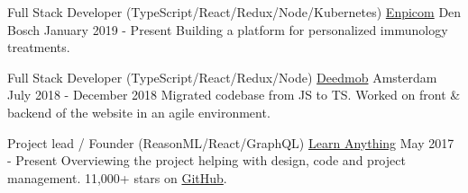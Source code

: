 
\begin{cventries}

  \cventry
    {Full Stack Developer (TypeScript/React/Redux/Node/Kubernetes)} %
    {\href{https://www.enpicom.com}{Enpicom}} %
    {Den Bosch} %
    {January 2019 - Present} %
    {
      {Building a platform for personalized immunology treatments.}
    }

  \cventry
    {Full Stack Developer (TypeScript/React/Redux/Node)} %
    {\href{https://www.deedmob.com}{Deedmob}} %
    {Amsterdam} %
    {July 2018 - December 2018} %
    {
      {Migrated codebase from JS to TS. Worked on front \& backend of the website in an agile environment.}
    }

  \cventry
    {Project lead / Founder (ReasonML/React/GraphQL)} %
    {\href{https://learn-anything.xyz}{Learn Anything}} %
    {} %
    {May 2017 - Present} %
    {
      {Overviewing the project helping with design, code and project management. 11,000+ stars on \href{https://github.com/learn-anything/learn-anything}{GitHub}.}
    }

\end{cventries}
